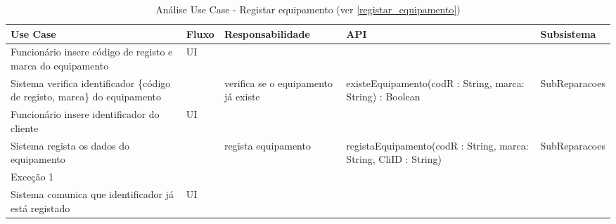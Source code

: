 \documentclass[../relatorio.tex]{subfiles}
\begin{document}
\begin{landscape}
    \begin{table}[!h]
        \centering
        \begin{tabular}{|p{5cm}|p{1cm}|p{4cm}|p{6cm}|p{3cm}|}
            \hline
            \rowcolor{gray!20!white}
            Use Case & Fluxo                                            & Responsabilidade & API & Subsistema \\
            \hline
            \rowcolor{yellow}
            Funcionário insere código de registo e marca do equipamento
                     & UI
                     & 
                     & 
                     & 
            \\
            \hline
            Sistema verifica identificador \{código de registo, marca\} do equipamento
                     & 
                     & verifica se o equipamento já existe
                     & existeEquipamento(codR : String, marca: String) : Boolean
                     & SubReparacoes
            \\
            \hline
            \rowcolor{yellow}
            Funcionário insere identificador do cliente
                     & UI
                     & 
                     & 
                     & 
            \\
            \hline
            Sistema regista os dados do equipamento
                     & 
                     & regista equipamento
                     & registaEquipamento(codR : String, marca: String, CliID : String)
                     & SubReparacoes
            \\
            \hline
            \rowcolor{red!30}
            Exceção 1  &                                                  &                  &     &            \\
            \hline
            Sistema comunica que identificador já está registado
                     & UI
                     & 
                     & 
                     & 
            \\
            \hline
        \end{tabular}
        \caption{Análise Use Case - Registar equipamento (ver \ref{registar_equipamento})}
    \end{table}
\end{landscape}
\end{document}
